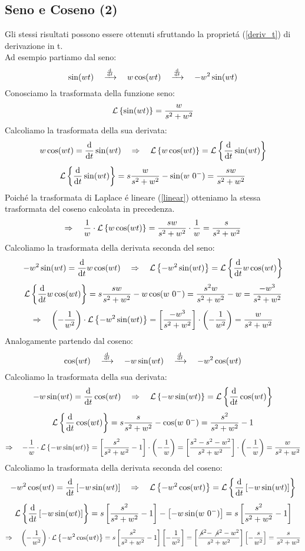 \documentclass[../main.tex]{subfiles}
\begin{document}
	\subsection{Seno e Coseno (2)}
	Gli stessi risultati possono essere ottenuti sfruttando la propriet\'{a} (\ref{deriv_t}) di derivazione in t.\\
	\linebreak\linebreak
	Ad esempio partiamo dal seno:
	$$ \sin(wt) \quad \xrightarrow{\frac{\mathrm{d} }{\mathrm{d} t}} \quad w \cos(wt) \quad \xrightarrow{\frac{\mathrm{d} }{\mathrm{d} t}} \quad -w^2 \sin(wt) $$
	Conosciamo la trasformata della funzione seno:
	$$ \mathcal{L} \left\lbrace \sin(wt) \right\rbrace = \frac{w}{s^2+w^2} $$
	Calcoliamo la trasformata della sua derivata:
	$$ w \cos(wt) = \frac{\mathrm{d} }{\mathrm{d} t} \sin(wt) \quad\Rightarrow\quad \mathcal{L} \left\lbrace w \cos(wt) \right\rbrace = \mathcal{L} \left\lbrace \frac{\mathrm{d} }{\mathrm{d} t} \sin(wt) \right\rbrace $$
	$$ \mathcal{L} \left\lbrace \frac{\mathrm{d} }{\mathrm{d} t} \sin(wt) \right\rbrace = s \frac{w}{s^2+w^2} - \sin(w\ 0^-) = \frac{sw}{s^2+w^2} $$
	Poich\'{e} la trasformata di Laplace \'{e} lineare (\ref{linear}) otteniamo la stessa trasformata del coseno calcolata in precedenza.
	$$ \Rightarrow \quad \frac{1}{w} \cdot \mathcal{L} \left\lbrace w\cos(wt) \right\rbrace = \frac{sw}{s^2+w^2} \cdot \frac{1}{w} = \frac{s}{s^2+w^2} $$
	Calcoliamo la trasformata della derivata seconda del seno:
	$$ -w^2 \sin(wt) = \frac{\mathrm{d} }{\mathrm{d} t} w\cos(wt) \quad\Rightarrow\quad \mathcal{L} \left\lbrace -w^2 \sin(wt) \right\rbrace = \mathcal{L} \left\lbrace \frac{\mathrm{d} }{\mathrm{d} t} w\cos(wt) \right\rbrace $$
	$$ \mathcal{L} \left\lbrace \frac{\mathrm{d} }{\mathrm{d} t} w\cos(wt) \right\rbrace = s \frac{sw}{s^2+w^2} - w\cos(w\ 0^-) = \frac{s^2w}{s^2+w^2} - w = \frac{-w^3}{s^2+w^2}$$
	$$ \Rightarrow \quad \left( - \frac{1}{w^2} \right) \cdot \mathcal{L} \left\lbrace -w^2 \sin(wt) \right\rbrace = \left[ \frac{-w^3}{s^2+w^2} \right] \cdot \left( - \frac{1}{w^2} \right) = \frac{w}{s^2+w^2} $$
	\linebreak\linebreak
	Analogamente partendo dal coseno:
	$$ \cos(wt) \quad \xrightarrow{\frac{\mathrm{d} }{\mathrm{d} t}} \quad -w\sin(wt) \quad \xrightarrow{\frac{\mathrm{d} }{\mathrm{d} t}} \quad -w^2\cos(wt) $$	
	Calcoliamo la trasformata della sua derivata:
	$$ -w\sin(wt) = \frac{\mathrm{d} }{\mathrm{d} t} \cos(wt) \quad\Rightarrow\quad \mathcal{L} \left\lbrace -w\sin(wt) \right\rbrace = \mathcal{L} \left\lbrace \frac{\mathrm{d} }{\mathrm{d} t} \cos(wt) \right\rbrace $$
	$$ \mathcal{L} \left\lbrace \frac{\mathrm{d} }{\mathrm{d} t} \cos(wt) \right\rbrace = s \frac{s}{s^2+w^2} - \cos(w\ 0^-) = \frac{s^2}{s^2+w^2} - 1 $$
	$$ \Rightarrow \quad -\frac{1}{w} \cdot \mathcal{L} \left\lbrace -w\sin(wt) \right\rbrace = \left[ \frac{s^2}{s^2+w^2} - 1 \right] \cdot \left( -\frac{1}{w}\right) = \left[ \frac{s^2-s^2-w^2}{s^2+w^2} \right] \cdot \left( -\frac{1}{w}\right) = \frac{w}{s^2+w^2} $$
	Calcoliamo la trasformata della derivata seconda del coseno:
	$$ -w^2 \cos(wt) = \frac{\mathrm{d} }{\mathrm{d} t} \left[ -w\sin(wt) \right] \quad\Rightarrow\quad \mathcal{L} \left\lbrace -w^2 \cos(wt) \right\rbrace = \mathcal{L} \left\lbrace \frac{\mathrm{d} }{\mathrm{d} t} \left[ -w\sin(wt) \right] \right\rbrace $$
	$$ \mathcal{L} \left\lbrace \frac{\mathrm{d} }{\mathrm{d} t} \left[ -w\sin(wt) \right] \right\rbrace = s \left[ \frac{s^2}{s^2+w^2} - 1 \right] - \left[ -w\sin(w\ 0^-) \right] = s \left[ \frac{s^2}{s^2+w^2} - 1 \right] $$
	$$ \Rightarrow \quad \left( - \frac{1}{w^2} \right) \cdot \mathcal{L} \left\lbrace -w^2 \cos(wt) \right\rbrace = s \left[ \frac{s^2}{s^2+w^2} - 1 \right] \left[ - \frac{1}{w^2} \right] = \left[ \frac{\not{s^2}-\not{s^2}-w^2}{s^2+w^2} \right] \left[ -\frac{s}{w^2} \right] = \frac{s}{s^2+w^2} $$
\end{document}
